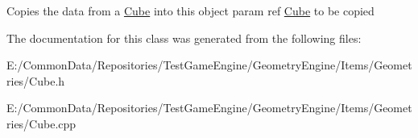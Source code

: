 Copies the data from a \mbox{\hyperlink{class_geometry_engine_1_1_geometry_world_item_1_1_geometry_item_1_1_cube}{Cube}} into this object param ref \mbox{\hyperlink{class_geometry_engine_1_1_geometry_world_item_1_1_geometry_item_1_1_cube}{Cube}} to be copied 

The documentation for this class was generated from the following files\+:\begin{DoxyCompactItemize}
\item 
E\+:/\+Common\+Data/\+Repositories/\+Test\+Game\+Engine/\+Geometry\+Engine/\+Items/\+Geometries/Cube.\+h\item 
E\+:/\+Common\+Data/\+Repositories/\+Test\+Game\+Engine/\+Geometry\+Engine/\+Items/\+Geometries/Cube.\+cpp\end{DoxyCompactItemize}
